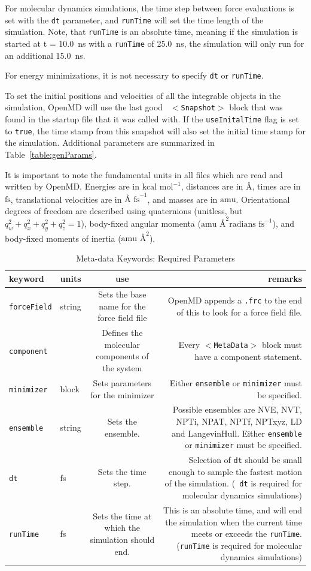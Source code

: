\documentclass[]{book}
\begin{document}
For molecular dynamics simulations, the time step between force
evaluations is set with the {\tt dt} parameter, and {\tt runTime} will
set the time length of the simulation. Note, that {\tt runTime} is an
absolute time, meaning if the simulation is started at t = 10.0~ns
with a {\tt runTime} of 25.0~ns, the simulation will only run for an
additional 15.0~ns.  

For energy minimizations, it is not necessary to specify {\tt dt} or
{\tt runTime}.

To set the initial positions and velocities of all the integrable
objects in the simulation, {\sc OpenMD} will use the last good {\tt
$<$Snapshot$>$} block that was found in the startup file that it was
called with.  If the {\tt useInitalTime} flag is set to {\tt true},
the time stamp from this snapshot will also set the initial time stamp
for the simulation.  Additional parameters are summarized in
Table~\ref{table:genParams}.

It is important to note the fundamental units in all files which are
read and written by {\sc OpenMD}.  Energies are in $\mbox{kcal
mol}^{-1}$, distances are in $\mbox{\AA}$, times are in $\mbox{fs}$,
translational velocities are in $\mbox{\AA~fs}^{-1}$, and masses are
in $\mbox{amu}$.  Orientational degrees of freedom are described using
quaternions (unitless, but $q_w^2 + q_x^2 + q_y^2 + q_z^2 = 1$),
body-fixed angular momenta ($\mbox{amu \AA}^{2} \mbox{radians
fs}^{-1}$), and body-fixed moments of inertia ($\mbox{amu \AA}^{2}$). 

\begin{longtable}[c]{ABCD}
\caption{Meta-data Keywords: Required Parameters}
\\
{\bf keyword} & {\bf units} & {\bf use} & {\bf remarks}  \\ \hline
\endhead
\hline
\endfoot
{\tt forceField} & string & Sets the base name for the force field file &
OpenMD appends a {\tt .frc} to the end of this to look for a force
field file.\\
{\tt component} & & Defines the molecular components of the system &
Every {\tt $<$MetaData$>$} block must have a component statement. \\
{\tt minimizer} & block & Sets parameters for the minimizer & Either {\tt ensemble} or {\tt minimizer} must be specified. \\
{\tt ensemble} & string & Sets the ensemble. & Possible ensembles are
NVE, NVT, NPTi, NPAT, NPTf, NPTxyz, LD and LangevinHull.  Either {\tt ensemble}
or {\tt minimizer} must be specified. \\
{\tt dt} & fs & Sets the time step. & Selection of {\tt dt} should be
small enough to sample the fastest motion of the simulation. ({\tt
dt} is required for molecular dynamics simulations)\\
{\tt runTime} & fs & Sets the time at which the simulation should
end. & This is an absolute time, and will end the simulation when the
current time meets or exceeds the {\tt runTime}. ({\tt runTime} is
required for molecular dynamics simulations)
\label{table:reqParams}
\end{longtable}
\end{document}
